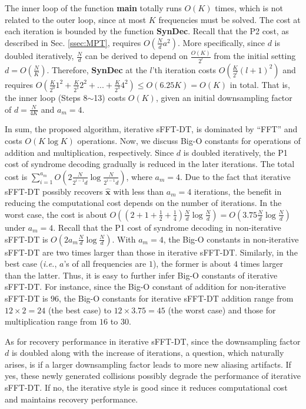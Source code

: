\documentclass[journal,onecolumn,11pt]{IEEEtran}
\begin{document}
The inner loop of the function \textbf{main} totally runs $O(K)$ times, which is not related to the outer loop, since at most $K$ frequencies must be solved.
The cost at each iteration is bounded by the function \textbf{SynDec}.
Recall that the P2 cost, as described in Sec. \ref{ssec:MPT}, requires $  O(\frac{N}{d}a^{2})$.
More specifically, since $d$ is doubled iteratively, $  \frac{N}{d}$ can be derived to depend on $  \frac{O(K)}{2^{l}}$ from the initial setting $  d=O(\frac{N}{K})$.
Therefore, \textbf{SynDec} at the $l$'th iteration costs $  O(\frac{K}{2^l}(l+1)^{2})$ and requires  $  O(\frac{K}{2^0}1^{2}+\frac{K}{2^1}2^{2}+...+\frac{K}{2^{3}}4^{2} ) \leq O(6.25K) = O(K)$ in total.
That is, the inner loop (Steps 8$\sim$13) costs $O(K)$, given an initial downsampling factor of $  d=\frac{N}{4K}$ and $a_{m}=4$.

In sum, the proposed algorithm, iterative sFFT-DT, is dominated by ``FFT'' and costs $O(K \log K)$ operations.
Now, we discuss Big-O constants for operations of addition and multiplication, respectively.
Since $d$ is doubled iteratively, the P1 cost of syndrome decoding gradually is reduced in the later iterations.
The total cost is $  \sum_{i=1}^{a_m} O(2\frac{N}{2^{i-1}d}\log\frac{N}{2^{i-1}d})$, where $a_m=4$.
Due to the fact that iterative sFFT-DT possibly recovers $\bm{\hat{x}}$ with less than $a_m=4$ iterations, the benefit in reducing the computational cost depends on the number of iterations.
In the worst case, the cost is about $  O((2+1+\frac{1}{2}+\frac{1}{4})\frac{N}{d}\log\frac{N}{d})= O(3.75\frac{N}{d}\log\frac{N}{d})$ under $a_m=4$.
Recall that the P1 cost of syndrome decoding in non-iterative sFFT-DT is $  O(2a_m \frac{N}{d}\log\frac{N}{d})$.
With $a_{m}=4$, the Big-O constants in non-iterative sFFT-DT are two times larger than those in iterative sFFT-DT. Similarly, in the best case ({\em i.e.}, $a$'s of all frequencies are $1$), the former is about $4$ times larger than the latter. Thus, it is easy to further infer Big-O constants of iterative sFFT-DT. For instance, since the Big-O constant of addition for non-iterative sFFT-DT is $96$, the Big-O constants for iterative sFFT-DT addition range from $12\times 2=24$ (the best case) to $12 \times 3.75 = 45$ (the worst case) and those for multiplication range from $16$ to $30$.

As for recovery performance in iterative sFFT-DT, since the downsampling factor $d$ is doubled along with the increase of iterations, a question, which naturally arises, is if a larger downsampling factor leads to more new aliasing artifacts.
If yes, these newly generated collisions possibly degrade the performance of iterative sFFT-DT.
If no, the iterative style is good since it reduces computational cost and maintains recovery performance.
\end{document}
